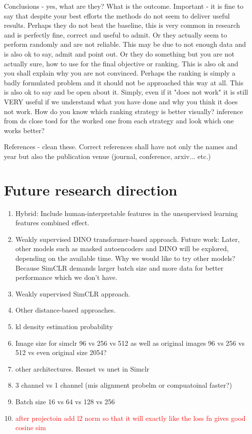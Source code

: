 	
	Conclusions - yes, what are they? What is the outcome. Important - it is fine to say that despite your best efforts the methods do not seem to
	 deliver useful results. Perhaps they do not beat the baseline, this is very common in research and is perfectly fine, correct and useful to admit.
	  Or they actually seem to perform randomly and are not reliable. This may be due to not enough data and is also ok to say, admit and point out. Or 
	  they do something but you are not actually sure, how to use for the final objective or ranking. This is also ok and you shall explain why you are 
	  not convinced. Perhaps the ranking is simply a badly formulated problem and it should not be approached this way at all. This is also ok to say and 
	  be open about it. Simply, even if it "does not work" it is still VERY useful if we understand what you have done and why you think it does not work.	
How do you know which ranking strategy is better visually? inference from ds close tosd for the worked one from each strategy and look which one works 
better?

References - clean these. Correct references shall have not only the names and year but also the publication venue (journal, conference, arxiv... etc.)

\section{Future research direction}

\begin{enumerate}
    \item Hybrid: Include human-interpretable features in the unsupervised learning features combined effect.
    \item Weakly supervised DINO transformer-based approach. Future work: Later, other models such as masked autoencoders and DINO will be explored, depending on the available time.
	Why we would like to try other models? Because SimCLR demands larger batch size and more data for better performance which we don't have.
    \item Weakly supervised SimCLR approach.
    \item Other distance-based approaches.
    \item kl density estimation probability
    \item Image size for simclr 96 vs 256 vs 512 as well as original images 96 vs 256 vs 512 vs even original size 2054?
    \item other architectures. Resnet vs unet in Simclr
    \item 3 channel vs 1 channel (mis alignment probelm or compuatoinal faster?)
    \item Batch size 16 vs 64 vs 128 vs 256
    \item \textcolor{red}{after projectoin add l2 norm so that it will exactly like the loss fn gives good cosine sim} 

\end{enumerate}
